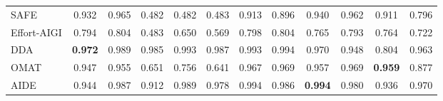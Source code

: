 \documentclass[sigconf,screen]{acmart}
\theoremstyle{plain}
\theoremstyle{definition}
\theoremstyle{remark}
\begin{document}
\begin{table}[h]
{\begin{tabular}{l|c|c|c|c|c|c|c|c|c|c|c}
SAFE & 0.932 & 0.965 & 0.482 & 0.482 & 0.483 & 0.913 & 0.896 & 0.940 & 0.962 & 0.911 & 0.796 \\
Effort-AIGI & 0.794 & 0.804 & 0.483 & 0.650 & 0.569 & 0.798 & 0.804 & 0.765 & 0.793 & 0.764 & 0.722 \\
DDA & \textbf{0.972} & 0.989 & 0.985 & 0.993 & 0.987 & 0.993 & 0.994 & 0.970 & 0.948 & 0.804 & 0.963 \\
OMAT & 0.947 & 0.955 & 0.651 & 0.756 & 0.641 & 0.967 & 0.969 & 0.957 & 0.969 & \textbf{0.959} & 0.877 \\
AIDE & 0.944 & 0.987 & 0.912 & 0.989 & 0.978 & 0.994 & 0.986 & \textbf{0.994} & 0.980 & 0.936 & 0.970 \\
\bottomrule
\end{tabular}
}
\label{tab:aigi-holmes}
\end{table}
\end{document}
